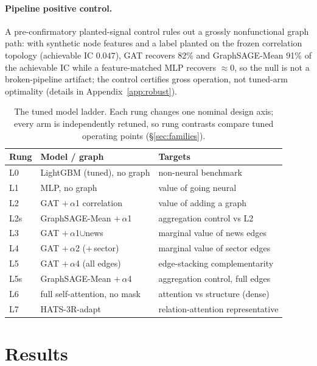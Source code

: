 \documentclass{article}
\newcommand{\compacttable}{\small\setlength{\tabcolsep}{4pt}\renewcommand{\arraystretch}{0.95}}
\begin{document}
\paragraph{Pipeline positive control.} A pre-confirmatory planted-signal control rules out a grossly nonfunctional graph path: with synthetic node features and a label planted on the frozen correlation topology (achievable IC $0.047$), GAT recovers 82\% and GraphSAGE-Mean 91\% of the achievable IC while a feature-matched MLP recovers ${\approx}0$, so the null is not a broken-pipeline artifact; the control certifies gross operation, not tuned-arm optimality (details in Appendix~\ref{app:robust}).

\begin{table}[t]
  \centering
  \caption{The tuned model ladder. Each rung changes one nominal design axis; every arm is independently retuned, so rung contrasts compare tuned operating points (\S\ref{sec:families}).}
  \label{tab:ladder}
  \compacttable
  \begin{tabular}{@{}lll@{}}
    \toprule
    Rung & Model / graph & Targets \\
    \midrule
    L0  & LightGBM (tuned), no graph     & non-neural benchmark \\
    L1  & MLP, no graph                  & value of going neural \\
    L2  & GAT $+\,\alpha$1 correlation   & value of adding a graph \\
    L2s & GraphSAGE-Mean $+\,\alpha$1    & aggregation control vs L2 \\
    L3  & GAT $+\,\alpha$1$\cup$news     & marginal value of news edges \\
    L4  & GAT $+\,\alpha$2 (+\,sector)   & marginal value of sector edges \\
    L5  & GAT $+\,\alpha$4 (all edges)   & edge-stacking complementarity \\
    L5s & GraphSAGE-Mean $+\,\alpha$4    & aggregation control, full edges \\
    L6  & full self-attention, no mask   & attention vs structure (dense) \\
    L7  & HATS-3R-adapt                  & relation-attention representative \\
    \bottomrule
  \end{tabular}
\end{table}

\section{Results}\label{sec:results}
\end{document}
